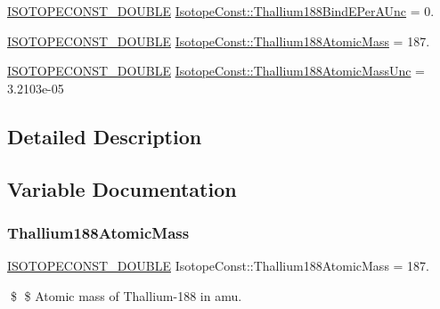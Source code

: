 \begin{DoxyCompactItemize}
\mbox{\hyperlink{group___isotope_const-_macros_ga8f45a7272ce02c0b4c65c44636ed719a}{I\+S\+O\+T\+O\+P\+E\+C\+O\+N\+S\+T\+\_\+\+D\+O\+U\+B\+LE}} \mbox{\hyperlink{group___isotope_const-_thallium-_tl188_ga0d7f3ceebbcfb91a336722d5d917baa0}{Isotope\+Const\+::\+Thallium188\+Bind\+E\+Per\+A\+Unc}} = 0.
\item 
\mbox{\hyperlink{group___isotope_const-_macros_ga8f45a7272ce02c0b4c65c44636ed719a}{I\+S\+O\+T\+O\+P\+E\+C\+O\+N\+S\+T\+\_\+\+D\+O\+U\+B\+LE}} \mbox{\hyperlink{group___isotope_const-_thallium-_tl188_ga8e1f45bed80c5ebc5516a94280437f8d}{Isotope\+Const\+::\+Thallium188\+Atomic\+Mass}} = 187.
\item 
\mbox{\hyperlink{group___isotope_const-_macros_ga8f45a7272ce02c0b4c65c44636ed719a}{I\+S\+O\+T\+O\+P\+E\+C\+O\+N\+S\+T\+\_\+\+D\+O\+U\+B\+LE}} \mbox{\hyperlink{group___isotope_const-_thallium-_tl188_ga5c129a76240ff5edf9498cf87784d161}{Isotope\+Const\+::\+Thallium188\+Atomic\+Mass\+Unc}} = 3.\+2103e-\/05
\end{DoxyCompactItemize}


\subsection{Detailed Description}


\subsection{Variable Documentation}
\mbox{\label{group___isotope_const-_thallium-_tl188_ga8e1f45bed80c5ebc5516a94280437f8d}} 
\subsubsection{\texorpdfstring{Thallium188\+Atomic\+Mass}{Thallium188AtomicMass}}
{\footnotesize\ttfamily \mbox{\hyperlink{group___isotope_const-_macros_ga8f45a7272ce02c0b4c65c44636ed719a}{I\+S\+O\+T\+O\+P\+E\+C\+O\+N\+S\+T\+\_\+\+D\+O\+U\+B\+LE}} Isotope\+Const\+::\+Thallium188\+Atomic\+Mass = 187.}

\$ \$ Atomic mass of Thallium-\/188 in amu. \mbox{\label{group___isotope_const-_thallium-_tl188_ga5c129a76240ff5edf9498cf87784d161}} 
